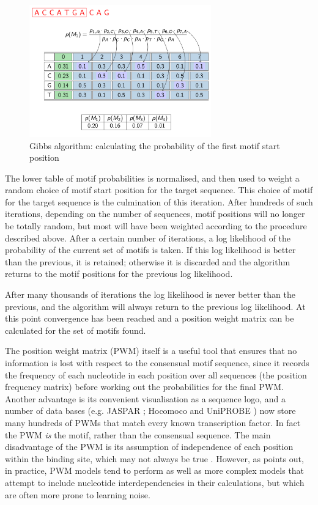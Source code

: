 \documentclass[12pt]{article}
\begin{document}
\begin{figure}[!htbp]
\centering
\includegraphics[width=0.7\textwidth]{GibbsTable1.png}
\caption{Gibbs algorithm: calculating the probability of the first motif start position}\label{gibbs2}
\end{figure}

The lower table of motif probabilities is normalised, and then used to weight a random choice of motif start position for the target sequence. This choice of motif for the target sequence is the culmination of this iteration. After hundreds of such iterations, depending on the number of sequences, motif positions will no longer be totally random, but most will have been weighted according to the procedure described above. After a certain number of iterations, a log likelihood of the probability of the current set of motifs is taken. If this log likelihood is better than the previous, it is retained; otherwise it is discarded and the algorithm returns to the motif positions for the previous log likelihood.

After many thousands of iterations the log likelihood is never better than the previous, and the algorithm will always return to the previous log likelihood. At this point convergence has been reached and a position weight matrix can be calculated for the set of motifs found.

The position weight matrix (PWM) itself is a useful tool that ensures that no information is lost with respect to the consensual motif sequence, since it records the frequency of each nucleotide in each position over all sequences (the position frequency matrix) before working out the probabilities for the final PWM. Another advantage is its convenient visualisation as a sequence logo, and a number of data bases (e.g. JASPAR \citep{Mathelier2016}; Hocomoco \citep{Kulakovskiy2018} and UniPROBE \citep{Hume2015}) now store many hundreds of PWMs that match every known transcription factor. In fact the PWM \textit{is} the motif, rather than the consensual sequence. The main disadvantage of the PWM is its assumption of independence of each position within the binding site, which may not always be true \citep{Jayaram2016}. However, as \citet{Jayaram2016} points out, in practice, PWM models tend to perform as well as more complex models that attempt to include nucleotide interdependencies in their calculations, but which are often more prone to learning noise.
\end{document}
